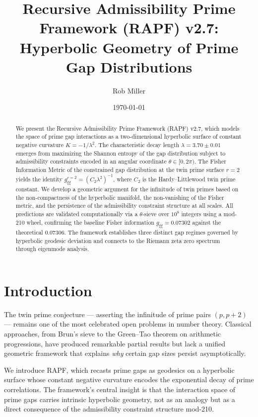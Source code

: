 \documentclass[12pt]{article}
\title{Recursive Admissibility Prime Framework (RAPF) v2.7:\\
Hyperbolic Geometry of Prime Gap Distributions}
\author{Rob Miller}
\date{\today}
\begin{document}
\maketitle

\begin{abstract}
We present the Recursive Admissibility Prime Framework (RAPF) v2.7, which
models the space of prime gap interactions as a two-dimensional hyperbolic
surface of constant negative curvature $K = -1/\lambda^2$. The characteristic
decay length $\lambda = 3.70 \pm 0.01$ emerges from maximizing the Shannon
entropy of the gap distribution subject to admissibility constraints encoded
in an angular coordinate $\theta \in [0, 2\pi)$. The Fisher Information Metric
of the constrained gap distribution at the twin prime surface $r=2$ yields the
identity $g_{\xi\xi}^{r=2} = (C_2 \lambda^2)^{-1}$, where $C_2$ is the
Hardy--Littlewood twin prime constant. We develop a geometric argument for the
infinitude of twin primes based on the non-compactness of the hyperbolic
manifold, the non-vanishing of the Fisher metric, and the persistence of the
admissibility constraint structure at all scales. All predictions are validated
computationally via a $\theta$-sieve over $10^8$ integers using a mod-210 wheel,
confirming the baseline Fisher information $g_{\xi\xi} = 0.07302$ against the
theoretical $0.07306$. The framework establishes three distinct gap regimes
governed by hyperbolic geodesic deviation and connects to the Riemann zeta
zero spectrum through eigenmode analysis.
\end{abstract}

\tableofcontents
\newpage

\section{Introduction}

The twin prime conjecture --- asserting the infinitude of prime pairs $(p, p+2)$
--- remains one of the most celebrated open problems in number theory. Classical
approaches, from Brun's sieve to the Green--Tao theorem on arithmetic progressions,
have produced remarkable partial results but lack a unified geometric framework that
explains \textit{why} certain gap sizes persist asymptotically.

We introduce RAPF, which recasts prime gaps as geodesics on a hyperbolic surface
whose constant negative curvature encodes the exponential decay of prime
correlations. The framework's central insight is that the interaction space of
prime gaps carries intrinsic hyperbolic geometry, not as an analogy but as a
direct consequence of the admissibility constraint structure mod-210.
\end{document}
